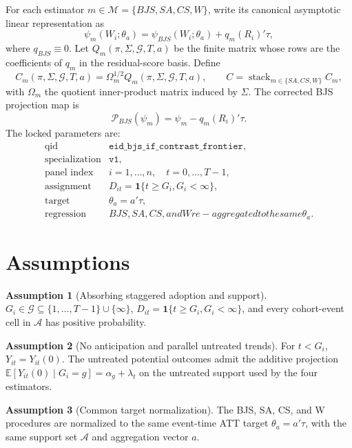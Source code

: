 \documentclass[11pt]{article}
\newcommand{\E}{\mathbb{E}}
\newcommand{\one}{\mathbf{1}}
\theoremstyle{definition}
\newtheorem{assumption}{Assumption}
\theoremstyle{plain}
\theoremstyle{remark}
\begin{document}
For each estimator \(m\in\mathcal M=\{BJS,SA,CS,W\}\), write its canonical asymptotic linear representation as
\[
  \psi_m(W_i;\theta_a)=\psi_{BJS}(W_i;\theta_a)+q_m(R_i)'\tau,
\]
where \(q_{BJS}\equiv0\). Let \(Q_m(\pi,\Sigma,\mathcal G,T,a)\) be the finite matrix whose rows are the coefficients of \(q_m\) in the residual-score basis. Define
\[
  C_m(\pi,\Sigma,\mathcal G,T,a)=\Omega_m^{1/2}Q_m(\pi,\Sigma,\mathcal G,T,a),
  \qquad
  C=\operatorname{stack}_{m\in\{SA,CS,W\}} C_m,
\]
with \(\Omega_m\) the quotient inner-product matrix induced by \(\Sigma\). The corrected BJS projection map is
\[
  \mathcal P_{BJS}(\psi_m)=\psi_m-q_m(R_i)'\tau.
\]
The locked parameters are:
\[
\begin{array}{ll}
\text{qid} & \texttt{eid\_bjs\_if\_contrast\_frontier},\\
\text{specialization} & \texttt{v1},\\
\text{panel index} & i=1,\ldots,n,\quad t=0,\ldots,T-1,\\
\text{assignment} & D_{it}=\one\{t\ge G_i,G_i<\infty\},\\
\text{target} & \theta_a=a'\tau,\\
\text{regression} & BJS, SA, CS, and W re-aggregated to the same \theta_a.
\end{array}
\]

\section{Assumptions}
\begin{assumption}[Absorbing staggered adoption and support]\label{ass:absorbing-support}
\(G_i\in\mathcal G\subseteq\{1,\ldots,T-1\}\cup\{\infty\}\), \(D_{it}=\one\{t\ge G_i,G_i<\infty\}\), and every cohort-event cell in \(\mathcal A\) has positive probability.
\end{assumption}

\begin{assumption}[No anticipation and parallel untreated trends]\label{ass:parallel}
For \(t<G_i\), \(Y_{it}=Y_{it}(0)\). The untreated potential outcomes admit the additive projection \(\E[Y_{it}(0)\mid G_i=g]=\alpha_g+\lambda_t\) on the untreated support used by the four estimators.
\end{assumption}

\begin{assumption}[Common target normalization]\label{ass:common-target}
The BJS, SA, CS, and W procedures are normalized to the same event-time ATT target \(\theta_a=a'\tau\), with the same support set \(\mathcal A\) and aggregation vector \(a\).
\end{assumption}
\end{document}

